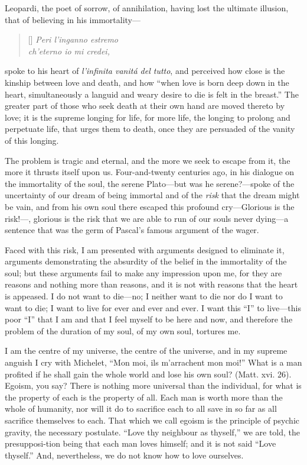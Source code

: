 Leopardi, the poet of sorrow, of annihilation, having lost the
ultimate illusion, that of believing in his immortality---

\settowidth{}
\begin{verse}[\versewidth]
\vin\textit{Peri l'inganno estremo\\
ch'eterno io mi credei,}
\end{verse}

\noindent spoke to his heart of \textit{l'infinita vanit\'a del
tutto}, and perceived how close is the kinship between love and death,
and how ``when love is born deep down in the heart, simultaneously a
languid and weary desire to die is felt in the breast.'' The greater
part of those who seek death at their own hand are moved thereto by
love; it is the supreme longing for life, for more life, the longing
 to prolong and perpetuate life, that urges them to death,
once they are persuaded of the vanity of this longing.

The problem is tragic and eternal, and the more we seek to escape from
it, the more it thrusts itself upon us. Four-and-twenty centuries ago,
in his dialogue on the immortality of the soul, the serene
Pla\-to---but was he serene?---spoke of the uncertainty of our dream
of being immortal and of the \textit{risk} that the dream might be
vain, and from his own soul there escaped this profound cry---Glorious
is the risk!---, glorious is the risk that
we are able to run of our souls never dy\-ing---a sentence that was
the germ of Pascal's famous argument of the wager.

Faced with this risk, I am presented with arguments designed to
eliminate it, arguments demonstrating the absurdity of the belief in
the immortality of the soul; but these arguments fail to make any
impression upon me, for they are reasons and nothing more than
reasons, and it is not with reasons that the heart is appeased. I do
not want to die---no; I neither want to die nor do I want to want to
die; I want to live for ever and ever and ever. I want this ``I'' to
live---this poor ``I'' that I am and that I feel myself to be here and
now, and therefore the problem of the duration of my soul, of my own
soul, tortures me.

I am the centre of my universe, the centre of the universe, and in my
supreme anguish I cry with Michelet, ``Mon moi, ils m'arrachent mon
moi!'' What is a man profited if he shall gain the whole world and
lose his own soul? (Matt. xvi. 26). Egoism, you say? There is nothing
more universal than the individual, for what is the property of each
is the property of all. Each man is worth more than the whole of
humanity, nor will it do to sacrifice each to all save in so far as
all sacrifice themselves to each. That which we call egoism is the
principle of psychic gravity, the necessary postulate. ``Love thy
neighbour as thyself,'' we are told, the presupposi-tion
being that each man loves himself; and it is not said ``Love
thyself.'' And, nevertheless, we do not know how to love ourselves.

